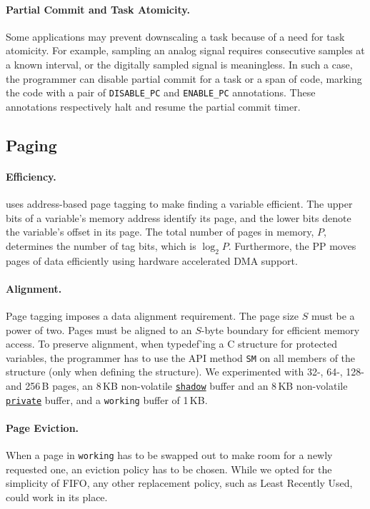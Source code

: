  \paragraph{Partial Commit and Task Atomicity.}
 Some applications may prevent
downscaling a task because of a need for task atomicity.  For example, sampling
an analog signal requires consecutive samples at a known interval, or the
digitally sampled signal is meaningless.  In such a case, the programmer can
disable partial commit for a task or a span of code, marking  the code with a
pair of \texttt{DISABLE\_PC} and \texttt{ENABLE\_PC} annotations.
These annotations respectively halt and resume the partial commit timer.

\subsection{Paging}
\label{sec:impl:paging}


\paragraph{Efficiency.}
\sys uses address-based page tagging to make finding a variable efficient.  The
upper bits of a variable's memory address identify its page, and the lower bits
denote the variable's offset in its page. The total number of pages in memory,
$P$, determines the number of tag bits, which is $\log_2 P$.
%
Furthermore, the PP moves pages of data efficiently using hardware accelerated DMA support.

\paragraph{Alignment.}
Page tagging imposes a data alignment requirement.
The page size $S$ must be a power of two. 
%
Pages must be aligned to an $S$-byte boundary for efficient memory access. 
%
To preserve alignment, when typedef'ing a C structure for protected variables, the programmer has to use the API method \texttt{SM} on all members of the structure (only when defining the structure).
%
We experimented with 32-, 64-, 128- and 256\,B pages, an 8\,KB non-volatile \texttt{\underline{shadow}} buffer and
an 8\,KB non-volatile \texttt{\underline{private}} buffer, and a \texttt{working} buffer
of 1\,KB.

\paragraph{Page Eviction.}
When a page in \texttt{working} has to be swapped out to make room for a newly requested one, an eviction policy has to be chosen.
While we opted for the simplicity of FIFO, any other replacement policy, such as Least Recently Used, could work in its place.

